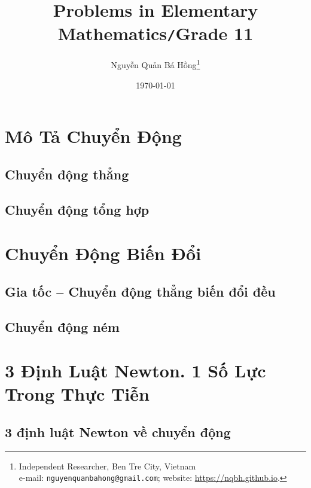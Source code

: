 \documentclass{article}
\title{Problems in Elementary Mathematics\texttt{/}Grade 11}
\author{Nguyễn Quản Bá Hồng\footnote{Independent Researcher, Ben Tre City, Vietnam\\e-mail: \texttt{nguyenquanbahong@gmail.com}; website: \url{https://nqbh.github.io}.}}
\date{\today}
\numberwithin{equation}{section}
\begin{document}
\maketitle
\begin{abstract}
	
\end{abstract}
\tableofcontents
\newpage


\section{Mô Tả Chuyển Động}

\subsection{Chuyển động thẳng}

\subsection{Chuyển động tổng hợp}


\section{Chuyển Động Biến Đổi}

\subsection{Gia tốc -- Chuyển động thẳng biến đổi đều}

\subsection{Chuyển động ném}


\section{3 Định Luật Newton. 1 Số Lực Trong Thực Tiễn}

\subsection{3 định luật Newton về chuyển động}
\end{document}
